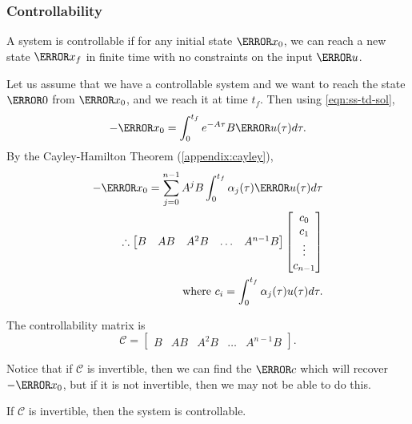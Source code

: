 \subsubsection{Controllability}
\begin{definition}
  A system is controllable if for any initial state $\V{x}_0$, we can reach a new state $\V{x}_f$ in finite time with no constraints on the input $\V{u}$.
  \label{defn:controllability}
\end{definition}
Let us assume that we have a controllable system and we want to reach the state $\V{0}$ from $\V{x}_0$, and we reach it at time $t_f$.
Then using \cref{eqn:ss-td-sol},
\[
  -\V{x}_0 = \int_0^{t_f} e^{-A\tau}B\V{u}(\tau)d\tau.
\]
By the Cayley-Hamilton Theorem (\cref{appendix:cayley}),
\begin{align*}
  -\V{x}_0 = \sum_{j=0}^{n-1}A^jB\int_0^{t_f}\alpha_j(\tau)\V{u}(\tau)d\tau\\
  \therefore \begin{bmatrix} B & AB & A^2 B & \ldots & A^{n-1}B \end{bmatrix}
  \begin{bmatrix} c_0 \\ c_1 \\ \vdots \\ c_{n-1} \end{bmatrix}\\
  \text{where } c_i = \int_0^{t_f} \alpha_j(\tau)u(\tau)d\tau.
\end{align*}
\begin{definition}
  The controllability matrix is
  \[
	\mathcal{C} = \begin{bmatrix} B & AB & A^2 B & \ldots & A^{n-1}B \end{bmatrix}.
  \]
  \label{defn:controllability-matrix}
\end{definition}
Notice that if $\mathcal{C}$ is invertible, then we can find the $\V{c}$ which will recover $-\V{x}_0$, but if it is not invertible, then we may not be able to do this.
\begin{theorem}
  If $\mathcal{C}$ is invertible, then the system is controllable.
  \label{thm:controllability}
\end{theorem}
